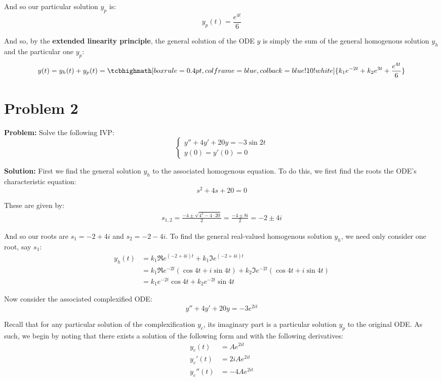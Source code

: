\documentclass{article}
\begin{document}
And so our particular solution $y_p$ is:
\begin{equation*}
  y_p(t)=\frac{e^{4t}}{6}
\end{equation*}

And so, by the \textbf{extended linearity principle}, the general solution of the ODE $y$ is simply the sum of the general homogenous solution $y_h$ and the particular one $y_p$:
\begin{equation*}
  y(t)=y_h(t)+y_p(t)=\tcbhighmath[boxrule=0.4pt,colframe=blue,colback=blue!10!white]{k_1e^{-2t}+k_2e^{3t}+\frac{e^{4t}}{6}}
\end{equation*}

\section*{Problem 2}
\noindent\textbf{Problem:} Solve the following IVP:
$$\begin{cases}
  y''+4y'+20y=-3\sin 2t\\
  y(0)=y'(0)=0
\end{cases}$$

\bigskip

\noindent\textbf{Solution:} First we find the general solution $y_h$ to the associated homogenous equation. To do this, we first find the roots the ODE's characteristic equation:
\begin{equation*}
  s^2+4s+20=0
\end{equation*}

These are given by:
\begin{align*}
  s_{1,2}=\frac{-4\pm\sqrt{4^2-4\cdot20}}{2}=\frac{-4\pm 8i}{2}=-2\pm 4i
\end{align*}

And so our roots are $s_1=-2+4i$ and $s_2=-2-4i$. To find the general real-valued homogenous solution $y_h$, we need only consider one root, say $s_1$:
\begin{align*}
  y_h(t)&=k_1\Re{e^{(-2+4i)t}}+k_1\Im{e^{(-2+4i)t}}\\
  &=k_1\Re{e^{-2t}(\cos 4t+i\sin4t)}+k_2\Im{e^{-2t}(\cos 4t+i\sin4t)}\\
  &=k_1e^{-2t}\cos 4t+k_2e^{-2t}\sin4t
\end{align*}

Now consider the associated complexified ODE:
\begin{equation*}
  y''+4y'+20y=-3e^{2it}
\end{equation*}

Recall that for any particular solution of the complexification $y_c$, its imaginary part is a particular solution $y_p$ to the original ODE. As such, we begin by noting that there exists a solution of the following form and with the following derivatives:
\begin{align*}
  y_c(t)&=Ae^{2it}\\
  y_c'(t)&=2iAe^{2it}\\
  y_c''(t)&=-4Ae^{2it}
\end{align*}
\end{document}
